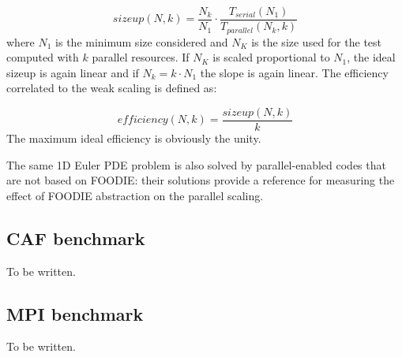 \begin{equation}
  sizeup(N, k) = \frac{N_k}{N_1} \cdot \frac{T_{serial}(N_1)}{T_{parallel}(N_k, k)}
  \label{eq:weak-scaling-sizeup}
\end{equation}
where $N_1$ is the minimum size considered and $N_K$ is the size used for the test computed with $k$ parallel resources. If $N_K$ is scaled proportional to $N_1$, the ideal sizeup is again linear and if $N_k = k \cdot N_1$ the slope is again linear. The efficiency correlated to the weak scaling is defined as:

\begin{equation}
  efficiency(N, k) = \frac{sizeup(N, k)}{k}
  \label{eq:weak-scaling-efficiency}
\end{equation}
The maximum ideal efficiency is obviously the unity.

The same 1D Euler PDE problem is also solved by parallel-enabled codes that are not based on FOODIE: their solutions provide a reference for measuring the effect of FOODIE abstraction on the parallel scaling.

\subsection{CAF benchmark}\label{subsec:caf}

{\color{red} To be written.}



\subsection{MPI benchmark}\label{subsec:mpi}

{\color{red} To be written.}
